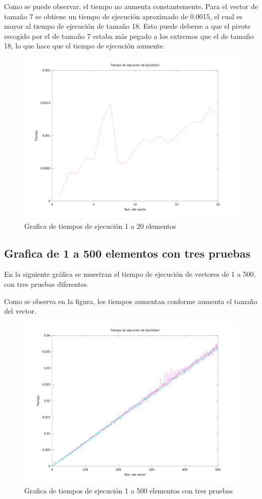 \documentclass[a4,12pt]{article}
\begin{document}
Como se puede observar, el tiempo no aumenta constantemente. Para el vector de tamaño 7 se obtiene un tiempo de ejecución aproximado de 0.0015, el cual es mayor al tiempo de ejecución de tamaño 18. Esto puede deberse a que el pivote escogido por el de tamaño 7 estaba más pegado a los extremos que el de tamaño 18, lo que hace que el tiempo de ejecución aumente.
\begin{figure}[h]
\includegraphics[width=1\textwidth]{Graficos/Grafica20}
\caption{Grafica de tiempos de ejecución 1 a 20 elementos}
\label{fig:Grafica20}
\end{figure}
\newpage
\subsection{Grafica de 1 a 500 elementos con tres pruebas}
En la siguiente gráfica se muestran el tiempo de ejecución de vectores de 1 a 500, con tres pruebas diferentes.

Como se observa en la figura, los tiempos aumentan conforme aumenta el tamaño del vector. 
\begin{figure}[h]
\includegraphics[width=1\textwidth]{Graficos/Grafica500}
\caption{Grafica de tiempos de ejecución 1 a 500 elementos con tres pruebas}
\label{fig:Grafica500}
\end{figure}
\newpage
\end{document}
